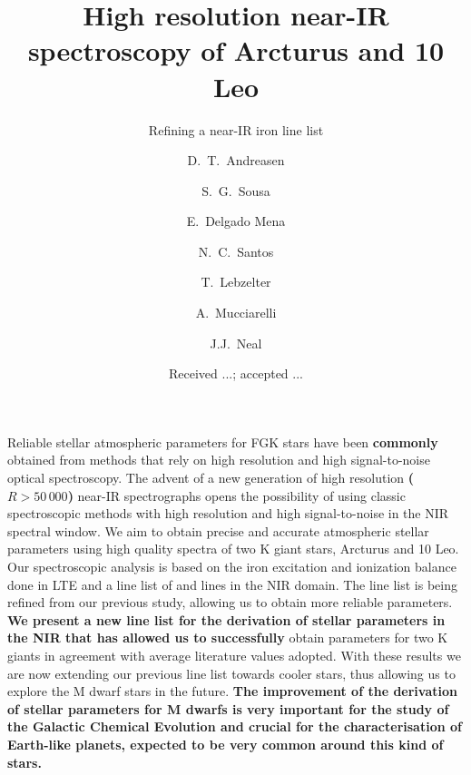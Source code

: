 \documentclass{aa}
\begin{document}
\title{High resolution near-IR spectroscopy of Arcturus and 10 Leo}
\subtitle{Refining a near-IR iron line list}


\author{ D.~T.~Andreasen
    \and S.~G.~Sousa
    \and E.~Delgado Mena
    \and N.~C.~Santos
    \and T.~Lebzelter
    \and A.~Mucciarelli
    \and J.J.~Neal}







\date{Received ...; accepted ...}

\abstract
{Reliable stellar atmospheric parameters for FGK stars have been {\bf commonly}
obtained from methods that rely on high resolution and high signal-to-noise
optical spectroscopy. The advent of a new generation of high resolution
{\bf ($R>50\,000$)} near-IR spectrographs opens the possibility of using classic
spectroscopic methods with high resolution and high signal-to-noise in the NIR
spectral window.}
{We aim to obtain precise and accurate atmospheric stellar parameters using high
quality spectra of two K giant stars, Arcturus and 10 Leo.}
{Our spectroscopic analysis is based on the iron excitation and ionization
balance done in LTE and a line list of  and  lines in the
NIR domain. The line list is being refined from our previous study, allowing us
to obtain more reliable parameters.}
{{\bf We present a new line list for the derivation of stellar parameters in the
NIR that has allowed us to successfully} obtain parameters for two K giants in
agreement with average literature values adopted.}
{With these results we are now extending our previous line list towards cooler
stars, thus allowing us to explore the M dwarf stars in the future. {\bf The
improvement of the derivation of stellar parameters for M dwarfs is very
important for the study of the Galactic Chemical Evolution and crucial for the
characterisation of Earth-like planets, expected to be very common around this
kind of stars.}}
\end{document}
